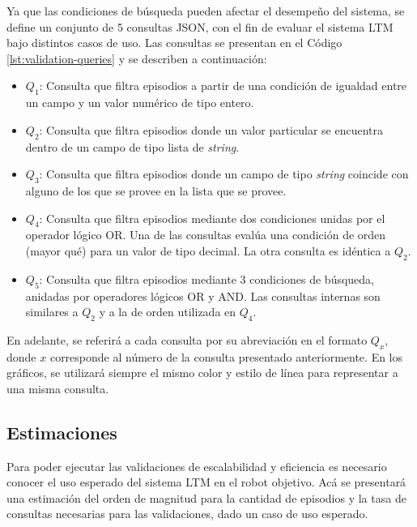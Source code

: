 Ya que las condiciones de búsqueda pueden afectar el desempeño del sistema, se define un conjunto de 5 consultas JSON, con el fin de evaluar el sistema LTM bajo distintos casos de uso. Las consultas se presentan en el Código \ref{lst:validation-queries} y se describen a continuación:
\begin{itemize}
	\item $Q_1$: Consulta que filtra episodios a partir de una condición de igualdad entre un campo y un valor numérico de tipo entero.
	\item $Q_2$: Consulta que filtra episodios donde un valor particular se encuentra dentro de un campo de tipo lista de \textit{string}.
	\item $Q_3$: Consulta que filtra episodios donde un campo de tipo \textit{string} coincide con alguno de los que se provee en la lista que se provee.
	\item $Q_4$: Consulta que filtra episodios mediante dos condiciones unidas por el operador lógico OR. Una de las consultas evalúa una condición de orden (mayor qué) para un valor de tipo decimal. La otra consulta es idéntica a $Q_2$.
	\item $Q_5$: Consulta que filtra episodios mediante 3 condiciones de búsqueda, anidadas por operadores lógicos OR y AND. Las consultas internas son similares a $Q_2$ y a la de orden utilizada en $Q_4$.
\end{itemize}
En adelante, se referirá a cada consulta por su abreviación en el formato $Q_x$, donde $x$ corresponde al número de la consulta presentado anteriormente. En los gráficos, se utilizará siempre el mismo color y estilo de línea para representar a una misma consulta.

\lstset{style=/Style/JSON}



\subsection{Estimaciones}

Para poder ejecutar las validaciones de escalabilidad y eficiencia es necesario conocer el uso esperado del sistema LTM en el robot objetivo. Acá se presentará una estimación del orden de magnitud para la cantidad de episodios y la tasa de consultas necesarias para las validaciones, dado un caso de uso esperado.

